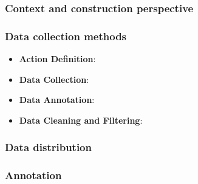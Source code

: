 \documentclass[10pt,onecolumn,letterpaper]{article}
\begin{document}
\subsubsection{Context and construction perspective}
\subsubsection{Data collection methods}
\begin{itemize}
	\item \textbf{Action Definition}:
	\item \textbf{Data Collection}:
	\item \textbf{Data Annotation}:
	\item \textbf{Data Cleaning and Filtering}:
\end{itemize}
\subsubsection{Data distribution}
\subsubsection{Annotation}



\end{document}
